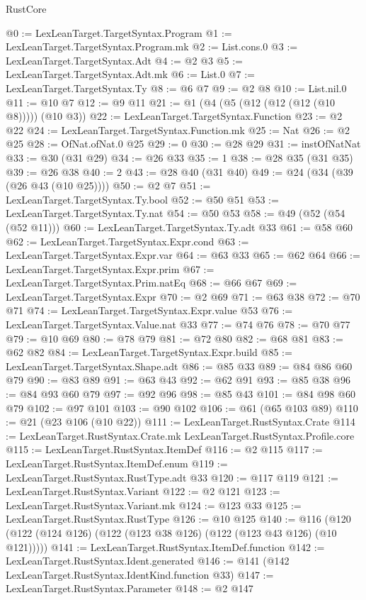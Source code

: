 \begin{lexlean}{RustCore}
\begin{coremodule}
@0 := LexLeanTarget.TargetSyntax.Program
@1 := LexLeanTarget.TargetSyntax.Program.mk
@2 := List.cons.{0}
@3 := LexLeanTarget.TargetSyntax.Adt
@4 := @2 @3
@5 := LexLeanTarget.TargetSyntax.Adt.mk
@6 := List.{0}
@7 := LexLeanTarget.TargetSyntax.Ty
@8 := @6 @7
@9 := @2 @8
@10 := List.nil.{0}
@11 := @10 @7
@12 := @9 @11
@21 := @1 (@4 (@5 (@12 (@12 (@12 (@10 @8))))) (@10 @3))
@22 := LexLeanTarget.TargetSyntax.Function
@23 := @2 @22
@24 := LexLeanTarget.TargetSyntax.Function.mk
@25 := Nat
@26 := @2 @25
@28 := OfNat.ofNat.{0} @25
@29 := 0
@30 := @28 @29
@31 := instOfNatNat
@33 := @30 (@31 @29)
@34 := @26 @33
@35 := 1
@38 := @28 @35 (@31 @35)
@39 := @26 @38
@40 := 2
@43 := @28 @40 (@31 @40)
@49 := @24 (@34 (@39 (@26 @43 (@10 @25))))
@50 := @2 @7
@51 := LexLeanTarget.TargetSyntax.Ty.bool
@52 := @50 @51
@53 := LexLeanTarget.TargetSyntax.Ty.nat
@54 := @50 @53
@58 := @49 (@52 (@54 (@52 @11)))
@60 := LexLeanTarget.TargetSyntax.Ty.adt @33
@61 := @58 @60
@62 := LexLeanTarget.TargetSyntax.Expr.cond
@63 := LexLeanTarget.TargetSyntax.Expr.var
@64 := @63 @33
@65 := @62 @64
@66 := LexLeanTarget.TargetSyntax.Expr.prim
@67 := LexLeanTarget.TargetSyntax.Prim.natEq
@68 := @66 @67
@69 := LexLeanTarget.TargetSyntax.Expr
@70 := @2 @69
@71 := @63 @38
@72 := @70 @71
@74 := LexLeanTarget.TargetSyntax.Expr.value @53
@76 := LexLeanTarget.TargetSyntax.Value.nat @33
@77 := @74 @76
@78 := @70 @77
@79 := @10 @69
@80 := @78 @79
@81 := @72 @80
@82 := @68 @81
@83 := @62 @82
@84 := LexLeanTarget.TargetSyntax.Expr.build
@85 := LexLeanTarget.TargetSyntax.Shape.adt
@86 := @85 @33
@89 := @84 @86 @60 @79
@90 := @83 @89
@91 := @63 @43
@92 := @62 @91
@93 := @85 @38
@96 := @84 @93 @60 @79
@97 := @92 @96
@98 := @85 @43
@101 := @84 @98 @60 @79
@102 := @97 @101
@103 := @90 @102
@106 := @61 (@65 @103 @89)
@110 := @21 (@23 @106 (@10 @22))
@111 := LexLeanTarget.RustSyntax.Crate
@114 := LexLeanTarget.RustSyntax.Crate.mk LexLeanTarget.RustSyntax.Profile.core
@115 := LexLeanTarget.RustSyntax.ItemDef
@116 := @2 @115
@117 := LexLeanTarget.RustSyntax.ItemDef.enum
@119 := LexLeanTarget.RustSyntax.RustType.adt @33
@120 := @117 @119
@121 := LexLeanTarget.RustSyntax.Variant
@122 := @2 @121
@123 := LexLeanTarget.RustSyntax.Variant.mk
@124 := @123 @33
@125 := LexLeanTarget.RustSyntax.RustType
@126 := @10 @125
@140 := @116 (@120 (@122 (@124 @126) (@122 (@123 @38 @126) (@122 (@123 @43 @126) (@10 @121)))))
@141 := LexLeanTarget.RustSyntax.ItemDef.function
@142 := LexLeanTarget.RustSyntax.Ident.generated
@146 := @141 (@142 LexLeanTarget.RustSyntax.IdentKind.function @33)
@147 := LexLeanTarget.RustSyntax.Parameter
@148 := @2 @147

\end{coremodule}
\end{lexlean}
